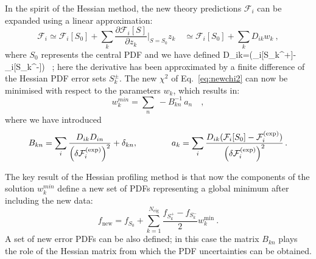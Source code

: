 In the spirit of the Hessian method, the new theory predictions $\mathcal{F}_i$ can be expanded
using a linear approximation:
\begin{equation}
\mathcal{F}_i \simeq \mathcal{F}_i[S_0] + \sum_k \frac{\partial\mathcal{F}_i[S]}{\partial z_k}\bigg|_{S=S_0} z_k \quad
              \simeq \mathcal{F}_i[S_0] + \sum_k D_{ik} w_k \ ,
\end{equation}
where $S_0$ represents the central PDF and we have defined
\be
D_{ik}=(_i[S_k^+]-_i[S_k^-]) \, ;
\ee
here the  derivative has been approximated by a finite difference of the 
Hessian PDF error sets $S_k^{\pm}$.
%
The new $\chi^2$ of Eq.~\eqref{eq:newchi2} can now be minimised with respect to the parameters $w_k$,
which results in:
\begin{equation}
%
w_k^{min}  = \sum_n \ -B_{kn}^{-1} \, a_n \quad ,
\end{equation}
where we have introduced
\begin{equation}
B_{kn} = \sum_i {{D_{ik}D_{in}}\over {\left(\delta\mathcal{F}_i^{\rm(exp)}\right)^2}} + \delta_{kn},
\qquad
\qquad
a_k = \sum_i {{D_{ik}(\mathcal{F}_i[S_0] - \mathcal{F}_i^{\rm(exp)})}\over {\left(\delta\mathcal{F}_i^{\rm(exp)}\right)^2}} \, . 
\end{equation}

The key result of the Hessian profiling method
is that now the components of the solution 
$w_k^{min}$
define a new set
of PDFs representing a global minimum after including the new data:
\begin{equation}
f_{\text{new}} = f_{S_0} + \sum_{k=1}^{N_{\text{eig}}} \frac{f_{S_k^+}-f_{S_k^-}}{2} w_k^{\text{min}} \ .
\end{equation}
A set of new error PDFs can be also defined; in this case the matrix $B_{kn}$ plays the role of
the Hessian matrix from which the PDF uncertainties
can be obtained. 

